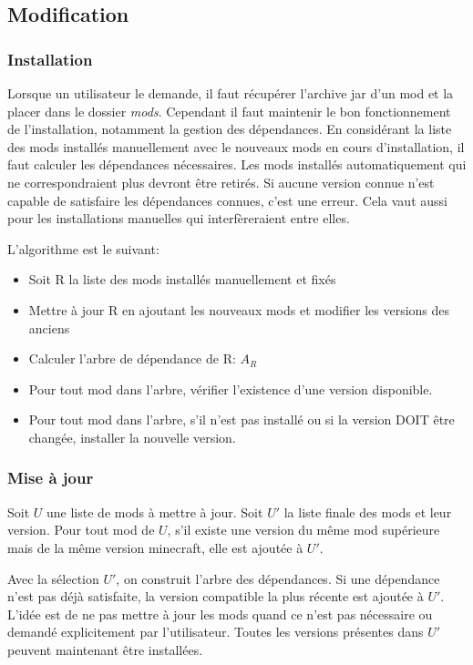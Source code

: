 \documentclass{article}
\begin{document}
\subsection{Modification}
\subsubsection{Installation}
Lorsque un utilisateur le demande, il faut récupérer l'archive jar d'un mod et la placer dans le dossier \textit{mods}.
Cependant il faut maintenir le bon fonctionnement de l'installation, notamment la gestion des dépendances.
En considérant la liste des mods installés manuellement avec le nouveaux mods en cours d'installation, il faut calculer les dépendances nécessaires.
Les mods installés automatiquement qui ne correspondraient plus devront être retirés.
Si aucune version connue n'est capable de satisfaire les dépendances connues, c'est une erreur.
Cela vaut aussi pour les installations manuelles qui interfèreraient entre elles.

L'algorithme est le suivant:
\begin{itemize}
    \item Soit R la liste des mods installés manuellement et fixés
    \item Mettre à jour R en ajoutant les nouveaux mods et modifier les versions des anciens
    \item Calculer l'arbre de dépendance de R: $A_R$
    \item Pour tout mod dans l'arbre, vérifier l'existence d'une version disponible.
    \item Pour tout mod dans l'arbre, s'il n'est pas installé ou si la version DOIT être changée, installer la nouvelle version.
\end{itemize}


\subsubsection{Mise à jour}
Soit $U$ une liste de mods à mettre à jour.
Soit $U'$ la liste finale des mods et leur version.
Pour tout mod de $U$, s'il existe une version du même mod supérieure mais de la même version minecraft, elle est ajoutée à $U'$.

Avec la sélection $U'$, on construit l'arbre des dépendances.
Si une dépendance n'est pas déjà satisfaite, la version compatible la plus récente est ajoutée à $U'$.
L'idée est de ne pas mettre à jour les mods quand ce n'est pas nécessaire ou demandé explicitement par l'utilisateur.
Toutes les versions présentes dans $U'$ peuvent maintenant être installées.
\end{document}
